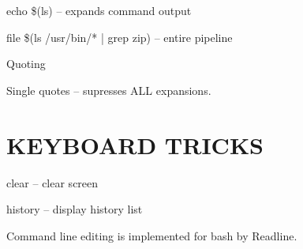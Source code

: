\documentclass[8pt]{extarticle}
\begin{document}
\begin{multicols}{2}
echo \$(ls) – expands command output

file \$(ls /usr/bin/* | grep zip) – entire pipeline




Quoting





Single quotes – supresses ALL expansions.





\section{KEYBOARD TRICKS}



clear – clear screen

history – display history list

Command line editing is implemented for bash by Readline.


\end{multicols}
\end{document}
